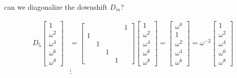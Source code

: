 \documentclass[10pt,
               svgnames,
               hyperref={colorlinks,citecolor=DeepPink4,linkcolor=FireBrick,urlcolor=Maroon},
               usepdftitle=false]{beamer}
\begin{document}
\begin{frame}{can we diagonalize the downshift $D_m$?}
\begin{itemize}
{\begin{align*}
D_5 \begin{bmatrix} 1 \\ \omega^2 \\ \omega^4 \\ \omega^6 \\ \omega^8 \end{bmatrix} &= \begin{bmatrix} & & & & 1 \\ 1 & & & & \\ & 1 & & & \\ & & 1 & & \\ & & & 1 & \end{bmatrix} \begin{bmatrix} 1 \\ \omega^2 \\ \omega^4 \\ \omega^6 \\ \omega^8 \end{bmatrix} = \begin{bmatrix} \omega^8 \\ 1 \\ \omega^2 \\ \omega^4 \\ \omega^6 \end{bmatrix} = \omega^{-2} \begin{bmatrix} 1 \\ \omega^2 \\ \omega^4 \\ \omega^6 \\ \omega^8 \end{bmatrix} \\
&\vdots
\end{align*}
}
\end{itemize}
\end{frame}
\end{document}
